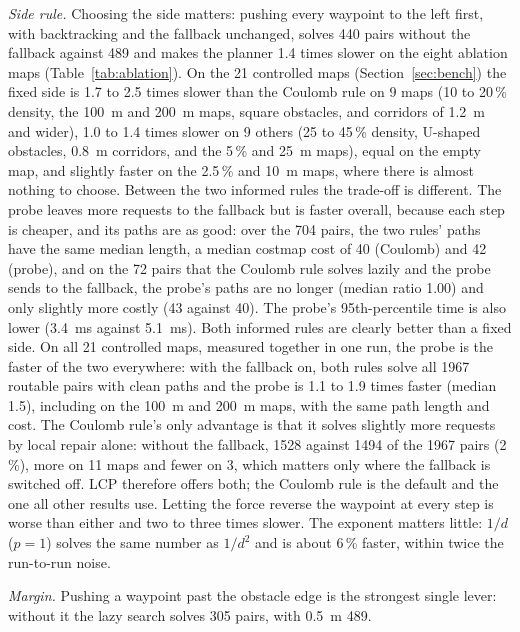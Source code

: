 \documentclass[conference]{IEEEtran}
\newcommand{\lcp}{LCP}
\begin{document}
\emph{Side rule.} Choosing the side matters: pushing every waypoint to the left
first, with backtracking and the fallback unchanged, solves 440 pairs without the
fallback against 489 and makes the planner 1.4 times slower on the eight ablation
maps (Table~\ref{tab:ablation}). On the 21 controlled maps (Section~\ref{sec:bench}) the fixed
side is 1.7 to 2.5 times slower than the Coulomb rule on 9 maps (10 to 20\,\%
density, the \SI{100}{m} and \SI{200}{m} maps, square obstacles, and corridors of
\SI{1.2}{m} and wider), 1.0 to 1.4 times slower on 9 others (25 to 45\,\%
density, U-shaped obstacles, \SI{0.8}{m} corridors, and the 5\,\% and \SI{25}{m}
maps), equal on the empty map, and slightly faster on the 2.5\,\% and \SI{10}{m}
maps, where there is almost nothing to choose. Between the two informed rules
the trade-off is different. The probe leaves more requests to the fallback but is
faster overall,
because each step is cheaper, and its paths are as good: over the 704 pairs, the
two rules' paths have the same median length, a median costmap cost of 40 (Coulomb) and 42 (probe),
and on the 72 pairs that the Coulomb rule solves lazily and the probe sends to the
fallback, the probe's paths are no longer (median ratio 1.00) and only slightly
more costly (43 against 40). The probe's 95th-percentile time is also lower
(\SI{3.4}{ms} against \SI{5.1}{ms}). Both informed rules are clearly better than a
fixed side. On all 21 controlled maps, measured together in one run, the probe is
the faster of the two everywhere: with the fallback on, both rules solve all
\num{1967} routable pairs with clean paths and the probe is 1.1 to 1.9 times
faster (median 1.5), including on the \SI{100}{m} and \SI{200}{m} maps, with the
same path length and cost. The Coulomb rule's only advantage is that it solves
slightly more requests by local repair alone: without the fallback, \num{1528}
against \num{1494} of the \num{1967} pairs (2\,\%), more on 11 maps and fewer on
3, which matters only where the fallback is switched off. \lcp{} therefore offers
both; the Coulomb rule is the default and the one all other results use. Letting the force
reverse the waypoint at every step is worse than either and two to three times
slower. The exponent matters little: $1/d$ ($p = 1$) solves the same number as
$1/d^2$ and is about 6\,\% faster, within twice the run-to-run noise.

\emph{Margin.} Pushing a waypoint past the obstacle edge is the strongest single
lever: without it the lazy search solves 305 pairs, with \SI{0.5}{m} 489.
\end{document}
